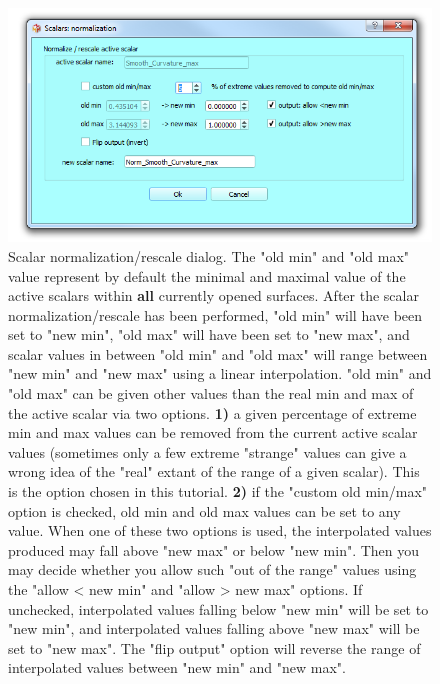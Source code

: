 \documentclass[12pt, a4paper]{book}
\begin{document}
\begin{figure}
  \centering
  \includegraphics[scale=0.5]{normalization_dialog.png} 
	\caption{ 
Scalar normalization/rescale dialog. The "old min" and "old max" value represent by default the minimal and maximal value of the active scalars within \textbf{all} currently opened surfaces. After the scalar normalization/rescale has been performed, "old min" will have been set to "new min", "old max" will have been set to "new max", and scalar values in between "old min" and "old max" will range between "new min" and "new max" using a linear interpolation. "old min" and "old max" can be given other values than the real min and max of the active scalar via two options. \textbf{1)} a given percentage of extreme min and max values can be removed from the current active scalar values (sometimes only a few extreme "strange" values can give a wrong idea of the "real" extant of the range of a given scalar). This is the option chosen in this tutorial. \textbf{2)} if the "custom old min/max" option is checked, old min and old max values can be set to any value.  When one of these two options is used, the interpolated values produced may fall above "new max" or below "new min". Then you may decide whether you allow such "out of the range" values using the "allow < new min" and "allow > new max" options. If unchecked, interpolated values falling below "new min" will be set to "new min", and interpolated values falling above "new max" will be set to "new max". The "flip output" option will reverse the range of interpolated values between "new min" and "new max".
	}
\label{normalization_dialog}
\end{figure}
\end{document}
